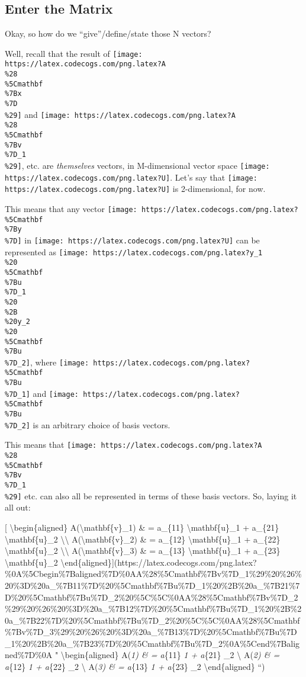 \documentclass[]{article}
\begin{document}
\hypertarget{enter-the-matrix}{%
\subsection{Enter the Matrix}\label{enter-the-matrix}}

Okay, so how do we ``give''/define/state those N vectors?

Well, recall that the result of
\texttt{[image: https://latex.codecogs.com/png.latex?A\\\%28\\\%5Cmathbf\\\%7Bx\\\%7D\\\%29]}
and
\texttt{[image: https://latex.codecogs.com/png.latex?A\\\%28\\\%5Cmathbf\\\%7Bv\\\%7D\_1\\\%29]},
etc. are \emph{themselves} vectors, in M-dimensional vector space
\texttt{[image: https://latex.codecogs.com/png.latex?U]}. Let's say that
\texttt{[image: https://latex.codecogs.com/png.latex?U]} is 2-dimensional, for
now.

This means that any vector
\texttt{[image: https://latex.codecogs.com/png.latex?\\\%5Cmathbf\\\%7By\\\%7D]} in
\texttt{[image: https://latex.codecogs.com/png.latex?U]} can be represented as
\texttt{[image: https://latex.codecogs.com/png.latex?y\_1\\\%20\\\%5Cmathbf\\\%7Bu\\\%7D\_1\\\%20\\\%2B\\\%20y\_2\\\%20\\\%5Cmathbf\\\%7Bu\\\%7D\_2]},
where
\texttt{[image: https://latex.codecogs.com/png.latex?\\\%5Cmathbf\\\%7Bu\\\%7D\_1]} and
\texttt{[image: https://latex.codecogs.com/png.latex?\\\%5Cmathbf\\\%7Bu\\\%7D\_2]} is
an arbitrary choice of basis vectors.

This means that
\texttt{[image: https://latex.codecogs.com/png.latex?A\\\%28\\\%5Cmathbf\\\%7Bv\\\%7D\_1\\\%29]}
etc. can also all be represented in terms of these basis vectors. So, laying it
all out:

{[} \textbackslash{}begin\{aligned\} A(\textbackslash{}mathbf\{v\}\_1) \& =
a\_\{11\} \textbackslash{}mathbf\{u\}\_1 + a\_\{21\}
\textbackslash{}mathbf\{u\}\_2 \textbackslash{}\textbackslash{}
A(\textbackslash{}mathbf\{v\}\_2) \& = a\_\{12\} \textbackslash{}mathbf\{u\}\_1
+ a\_\{22\} \textbackslash{}mathbf\{u\}\_2 \textbackslash{}\textbackslash{}
A(\textbackslash{}mathbf\{v\}\_3) \& = a\_\{13\} \textbackslash{}mathbf\{u\}\_1
+ a\_\{23\} \textbackslash{}mathbf\{u\}\_2
\textbackslash{}end\{aligned\}{]}(https://latex.codecogs.com/png.latex?\%0A\%5Cbegin\%7Baligned\%7D\%0AA\%28\%5Cmathbf\%7Bv\%7D\_1\%29\%20\%26\%20\%3D\%20a\_\%7B11\%7D\%20\%5Cmathbf\%7Bu\%7D\_1\%20\%2B\%20a\_\%7B21\%7D\%20\%5Cmathbf\%7Bu\%7D\_2\%20\%5C\%5C\%0AA\%28\%5Cmathbf\%7Bv\%7D\_2\%29\%20\%26\%20\%3D\%20a\_\%7B12\%7D\%20\%5Cmathbf\%7Bu\%7D\_1\%20\%2B\%20a\_\%7B22\%7D\%20\%5Cmathbf\%7Bu\%7D\_2\%20\%5C\%5C\%0AA\%28\%5Cmathbf\%7Bv\%7D\_3\%29\%20\%26\%20\%3D\%20a\_\%7B13\%7D\%20\%5Cmathbf\%7Bu\%7D\_1\%20\%2B\%20a\_\%7B23\%7D\%20\%5Cmathbf\%7Bu\%7D\_2\%0A\%5Cend\%7Baligned\%7D\%0A
" \textbackslash{}begin\{aligned\} A(\emph{1) \& = a}\{11\}
\emph{1 + a}\{21\} \_2 \textbackslash{} A(\emph{2)
\& = a}\{12\} \emph{1 + a}\{22\} \_2 \textbackslash{}
A(\emph{3) \& = a}\{13\} \emph{1 + a}\{23\} \_2
\textbackslash{}end\{aligned\} ``)
\end{document}
